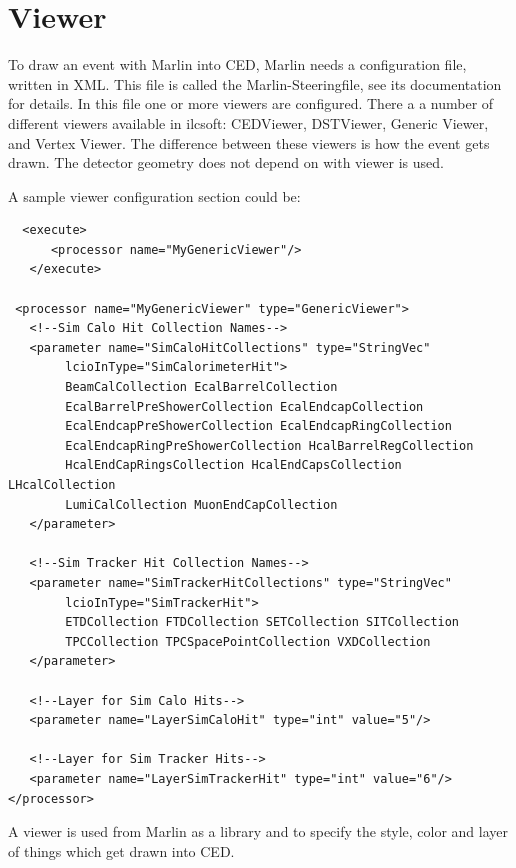 \documentclass[a4paper,10pt]{article}
\begin{document}

\section{Viewer}
To draw an event with Marlin into CED, Marlin needs a configuration file, written in XML. This file is called the Marlin-Steeringfile, see its documentation for details. In this file one or more viewers are configured. There a a number of different viewers available in ilcsoft: CEDViewer, DSTViewer, Generic Viewer, and Vertex Viewer. The difference between these viewers is how the event gets drawn. The detector geometry does not depend on with viewer is used. 

A sample viewer configuration section could be:
 \begin{verbatim}
  <execute>
      <processor name="MyGenericViewer"/>
   </execute>

 <processor name="MyGenericViewer" type="GenericViewer">
   <!--Sim Calo Hit Collection Names-->
   <parameter name="SimCaloHitCollections" type="StringVec"
        lcioInType="SimCalorimeterHit"> 
        BeamCalCollection EcalBarrelCollection
        EcalBarrelPreShowerCollection EcalEndcapCollection 
        EcalEndcapPreShowerCollection EcalEndcapRingCollection 
        EcalEndcapRingPreShowerCollection HcalBarrelRegCollection 
        HcalEndCapRingsCollection HcalEndCapsCollection LHcalCollection 
        LumiCalCollection MuonEndCapCollection 
   </parameter>
   
   <!--Sim Tracker Hit Collection Names-->
   <parameter name="SimTrackerHitCollections" type="StringVec" 
        lcioInType="SimTrackerHit"> 
        ETDCollection FTDCollection SETCollection SITCollection 
        TPCCollection TPCSpacePointCollection VXDCollection 
   </parameter>

   <!--Layer for Sim Calo Hits-->
   <parameter name="LayerSimCaloHit" type="int" value="5"/>
   
   <!--Layer for Sim Tracker Hits-->
   <parameter name="LayerSimTrackerHit" type="int" value="6"/>
</processor>

 \end{verbatim}
A viewer is used from Marlin as a library and to specify the style, color and layer of things which get drawn into CED.
\end{document}
